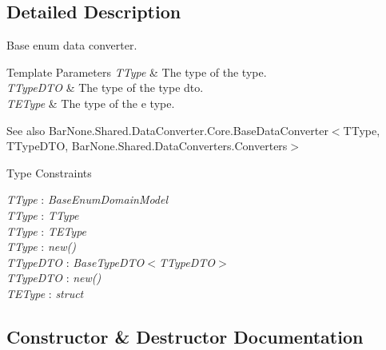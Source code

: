 \subsection{Detailed Description}
Base enum data converter. 


\begin{DoxyTemplParams}{Template Parameters}
{\em T\+Type} & The type of the type.\\
\hline
{\em T\+Type\+D\+TO} & The type of the type dto.\\
\hline
{\em T\+E\+Type} & The type of the e type.\\
\hline
\end{DoxyTemplParams}
\begin{DoxySeeAlso}{See also}
Bar\+None.\+Shared.\+Data\+Converter.\+Core.\+Base\+Data\+Converter$<$\+T\+Type, T\+Type\+D\+T\+O, Bar\+None.\+Shared.\+Data\+Converters.\+Converters$>$


\end{DoxySeeAlso}
\begin{Desc}
\item[Type Constraints]\begin{description}
\item[{\em T\+Type} : {\em Base\+Enum\+Domain\+Model}]\item[{\em T\+Type} : {\em T\+Type}]\item[{\em T\+Type} : {\em T\+E\+Type}]\item[{\em T\+Type} : {\em new()}]\item[{\em T\+Type\+D\+TO} : {\em Base\+Type\+D\+TO$<$T\+Type\+D\+TO$>$}]\item[{\em T\+Type\+D\+TO} : {\em new()}]\item[{\em T\+E\+Type} : {\em struct}]\end{description}
\end{Desc}


\subsection{Constructor \& Destructor Documentation}
\mbox{\label{class_bar_none_1_1_shared_1_1_data_converters_1_1_core_1_1_base_enum_data_converter_a3696f6d6da7417940d0ab76b4e64f990}} 
